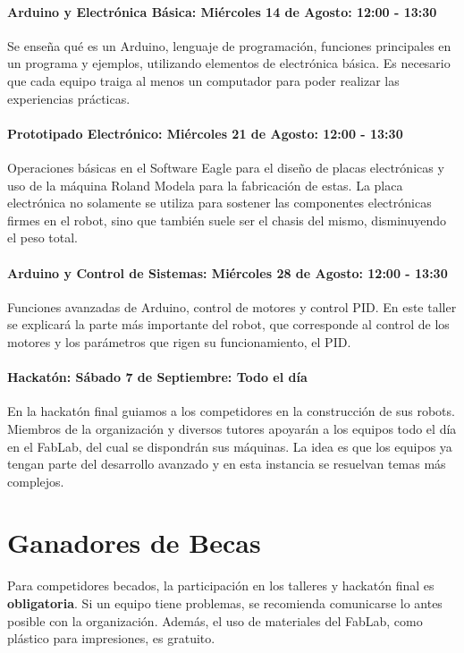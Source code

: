 \paragraph*{Arduino y Electrónica Básica: Miércoles 14 de Agosto: 12:00 - 13:30}
Se enseña qué es un Arduino, lenguaje de programación, funciones principales en un programa y ejemplos, utilizando elementos de electrónica básica.
Es necesario que cada equipo traiga al menos un computador para poder realizar las experiencias prácticas.

\paragraph*{Prototipado Electrónico: Miércoles 21 de Agosto: 12:00 - 13:30}
Operaciones básicas en el Software Eagle para el diseño de placas electrónicas y uso de la máquina Roland Modela para la fabricación de estas.
La placa electrónica no solamente se utiliza para sostener las componentes electrónicas firmes en el robot, sino que también suele ser el chasis del mismo, disminuyendo el peso total.

\paragraph*{Arduino y Control de Sistemas: Miércoles 28 de Agosto: 12:00 - 13:30}
Funciones avanzadas de Arduino, control de motores y control PID.
En este taller se explicará la parte más importante del robot, que corresponde al control de los motores y los parámetros que rigen su funcionamiento, el PID.

\paragraph*{Hackatón: Sábado 7 de Septiembre: Todo el día}
En la hackatón final guiamos a los competidores en la construcción de sus robots.
Miembros de la organización y diversos tutores apoyarán a los equipos todo el día en el FabLab, del cual se dispondrán sus máquinas.
La idea es que los equipos ya tengan parte del desarrollo avanzado y en esta instancia se resuelvan temas más complejos.

\section{Ganadores de Becas}

Para competidores becados, la participación en los talleres y hackatón final es \textbf{obligatoria}.
Si un equipo tiene problemas, se recomienda comunicarse lo antes posible con la organización.
Además, el uso de materiales del FabLab, como plástico para impresiones, es gratuito.

